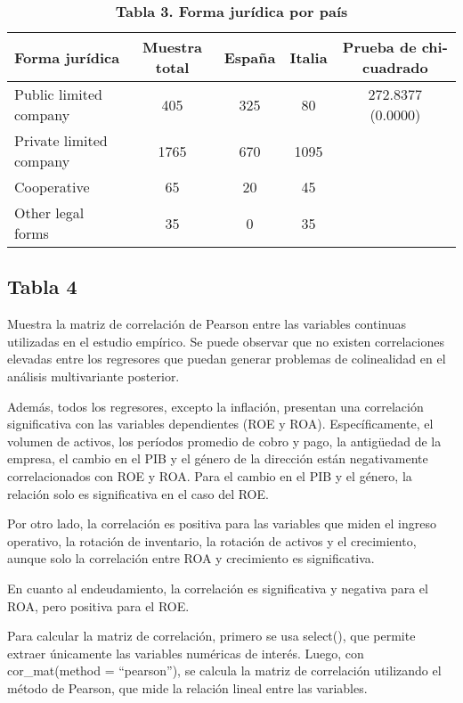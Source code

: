 \documentclass[
]{article}
\begin{document}
\begin{table}[!t]
\caption*{
{\large \textbf{Tabla 3. Forma jurídica por país}}
} 
\fontsize{9.0pt}{10.8pt}\selectfont
\begin{tabular*}{\linewidth}{@{\extracolsep{\fill}}lcccc}
\toprule
\textbf{Forma jurídica} & \textbf{Muestra total} & \textbf{España} & \textbf{Italia} & \textbf{Prueba de chi-cuadrado} \\ 
\midrule\addlinespace[2.5pt]
Public limited company & 405 & 325 & 80 & 272.8377 (0.0000) \\ 
Private limited company & 1765 & 670 & 1095 &  \\ 
Cooperative & 65 & 20 & 45 &  \\ 
Other legal forms & 35 & 0 & 35 &  \\ 
\bottomrule
\end{tabular*}
\end{table}

\subsection{Tabla 4}\label{tabla-4}

Muestra la matriz de correlación de Pearson entre las variables
continuas utilizadas en el estudio empírico. Se puede observar que no
existen correlaciones elevadas entre los regresores que puedan generar
problemas de colinealidad en el análisis multivariante posterior.

Además, todos los regresores, excepto la inflación, presentan una
correlación significativa con las variables dependientes (ROE y ROA).
Específicamente, el volumen de activos, los períodos promedio de cobro y
pago, la antigüedad de la empresa, el cambio en el PIB y el género de la
dirección están negativamente correlacionados con ROE y ROA. Para el
cambio en el PIB y el género, la relación solo es significativa en el
caso del ROE.

Por otro lado, la correlación es positiva para las variables que miden
el ingreso operativo, la rotación de inventario, la rotación de activos
y el crecimiento, aunque solo la correlación entre ROA y crecimiento es
significativa.

En cuanto al endeudamiento, la correlación es significativa y negativa
para el ROA, pero positiva para el ROE.

Para calcular la matriz de correlación, primero se usa select(), que
permite extraer únicamente las variables numéricas de interés. Luego,
con cor\_mat(method = ``pearson''), se calcula la matriz de correlación
utilizando el método de Pearson, que mide la relación lineal entre las
variables.
\end{document}
